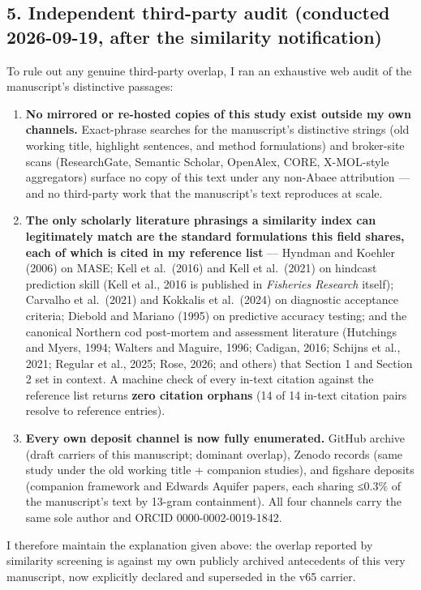 \documentclass[11pt]{article}
\providecommand{\tightlist}{\setlength{\itemsep}{0.2em}\setlength{\parskip}{0pt}}
\begin{document}
\subsection{5. Independent third-party audit (conducted 2026-09-19,
after the similarity
notification)}\label{independent-third-party-audit-conducted-2026-09-19-after-the-similarity-notification}

To rule out any genuine third-party overlap, I ran an exhaustive web
audit of the manuscript's distinctive passages:

\begin{enumerate}
\def\labelenumi{\arabic{enumi}.}
\tightlist
\item
  \textbf{No mirrored or re-hosted copies of this study exist outside my
  own channels.} Exact-phrase searches for the manuscript's distinctive
  strings (old working title, highlight sentences, and method
  formulations) and broker-site scans (ResearchGate, Semantic Scholar,
  OpenAlex, CORE, X-MOL-style aggregators) surface no copy of this text
  under any non-Abaee attribution --- and no third-party work that the
  manuscript's text reproduces at scale.
\item
  \textbf{The only scholarly literature phrasings a similarity index can
  legitimately match are the standard formulations this field shares,
  each of which is cited in my reference list} --- Hyndman and Koehler
  (2006) on MASE; Kell et al.~(2016) and Kell et al.~(2021) on hindcast
  prediction skill (Kell et al., 2016 is published in \emph{Fisheries
  Research} itself); Carvalho et al.~(2021) and Kokkalis et al.~(2024)
  on diagnostic acceptance criteria; Diebold and Mariano (1995) on
  predictive accuracy testing; and the canonical Northern cod
  post-mortem and assessment literature (Hutchings and Myers, 1994;
  Walters and Maguire, 1996; Cadigan, 2016; Schijns et al., 2021;
  Regular et al., 2025; Rose, 2026; and others) that Section 1 and
  Section 2 set in context. A machine check of every in-text citation
  against the reference list returns \textbf{zero citation orphans} (14
  of 14 in-text citation pairs resolve to reference entries).
\item
  \textbf{Every own deposit channel is now fully enumerated.} GitHub
  archive (draft carriers of this manuscript; dominant overlap), Zenodo
  records (same study under the old working title + companion studies),
  and figshare deposits (companion framework and Edwards Aquifer papers,
  each sharing ≤0.3\% of the manuscript's text by 13-gram containment).
  All four channels carry the same sole author and ORCID
  0000-0002-0019-1842.
\end{enumerate}

I therefore maintain the explanation given above: the overlap reported
by similarity screening is against my own publicly archived antecedents
of this very manuscript, now explicitly declared and superseded in the
v65 carrier.
\end{document}
